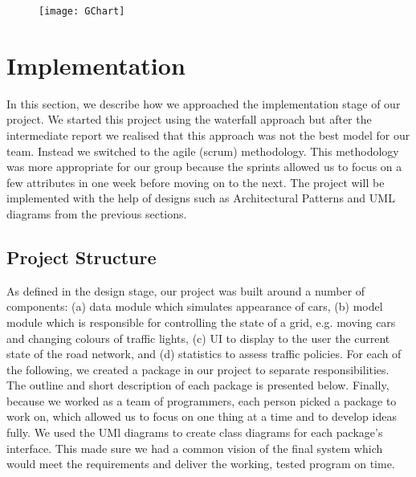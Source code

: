 \documentclass{article}
\begin{document}
	\begin{figure}
		\centering
		\texttt{[image: GChart]}
        \caption{}
        \label{Gchart}
	\end{figure}
    
    
	
	
	\section{Implementation}
	In this section, we describe how we approached the implementation stage of
	our project. We started this project using the waterfall approach but after the intermediate report we realised that this approach was not the best model for our team. Instead we switched to the agile (scrum) methodology. This methodology was more appropriate for our group because the sprints allowed us to focus on a few attributes in one week before moving on to the next. The project will be implemented with the help of designs such as Architectural Patterns and UML diagrams from the previous sections.
	
	
	
	\subsection{Project Structure}
 	As defined in the design stage, our project was built around a number of components: (a) data module which simulates appearance of cars, (b) model module which is responsible for controlling the state of a grid, e.g. moving cars and changing colours of traffic lights, (c) UI to display to the user the current state of the road network, and (d) statistics to assess traffic policies. 
 	For each of the following, we created a package in our project to separate responsibilities. 
 	The outline and short description of each package is presented below. Finally, because we worked as a team of programmers, each person picked a package to work on, which allowed us to focus on one thing at a time and to develop ideas fully. We used the UMl diagrams to create class diagrams for each package's interface. This made sure we had a common vision of the final system which would meet the requirements and deliver the working, tested program on time. 
	
\end{document}
